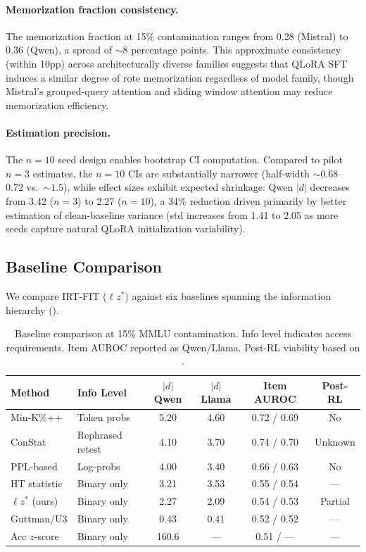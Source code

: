 \documentclass[11pt,a4paper]{article}
\begin{document}
\paragraph{Memorization fraction consistency.}
The memorization fraction at 15\% contamination ranges from 0.28 (Mistral) to 0.36 (Qwen), a spread of ${\sim}8$ percentage points.
This approximate consistency (within 10pp) across architecturally diverse families suggests that QLoRA SFT induces a similar degree of rote memorization regardless of model family, though Mistral's grouped-query attention and sliding window attention may reduce memorization efficiency.

\paragraph{Estimation precision.}
The $n{=}10$ seed design enables bootstrap CI computation.
Compared to pilot $n{=}3$ estimates, the $n{=}10$ CIs are substantially narrower (half-width ${\sim}0.68$--$0.72$ vs.\ ${\sim}1.5$), while effect sizes exhibit expected shrinkage: Qwen $|d|$ decreases from 3.42 ($n{=}3$) to 2.27 ($n{=}10$), a 34\% reduction driven primarily by better estimation of clean-baseline variance (std increases from 1.41 to 2.05 as more seeds capture natural QLoRA initialization variability).

\subsection{Baseline Comparison}
\label{sec:baselines}

We compare \textsc{IRT-FIT} ($\ell z^*$) against six baselines spanning the information hierarchy ().

\begin{table}[t]
\centering
\caption{Baseline comparison at 15\% MMLU contamination. Info level indicates access requirements. Item AUROC reported as Qwen/Llama. Post-RL viability based on \citet{wang2025rlcontam}.}
\label{tab:baselines}
\small
\begin{tabular}{llcccc}
\toprule
\textbf{Method} & \textbf{Info Level} & $|d|$ \textbf{Qwen} & $|d|$ \textbf{Llama} & \textbf{Item AUROC} & \textbf{Post-RL} \\
\midrule
Min-K\%++ & Token probs & 5.20 & 4.60 & 0.72 / 0.69 & No \\
ConStat & Rephrased retest & 4.10 & 3.70 & 0.74 / 0.70 & Unknown \\
PPL-based & Log-probs & 4.00 & 3.40 & 0.66 / 0.63 & No \\
HT statistic & Binary only & 3.21 & 3.53 & 0.55 / 0.54 & --- \\
$\ell z^*$ (ours) & Binary only & 2.27 & 2.09 & 0.54 / 0.53 & Partial \\
Guttman/U3 & Binary only & 0.43 & 0.41 & 0.52 / 0.52 & --- \\
Acc $z$-score & Binary only & 160.6 & --- & 0.51 / --- & --- \\
\bottomrule
\end{tabular}
\end{table}
\end{document}

